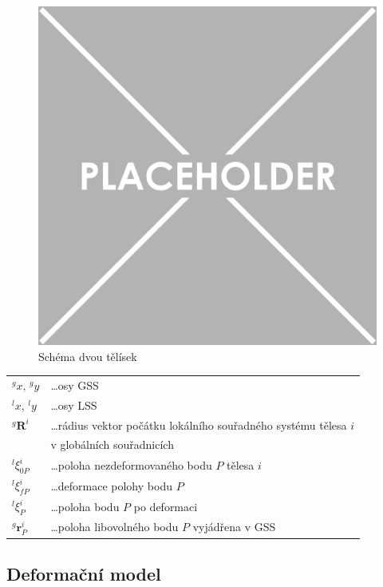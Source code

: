 \begin{figure}[h]
	\centering
	\includegraphics[width=0.85\linewidth]{img/placeholder.pdf}
	\caption{Schéma dvou tělísek}
	\label{fig:MBS_metoda}
\end{figure}

\begin{tabular}{@{}ll}
	$^gx, \, ^gy$ &\dots osy GSS\\
	$^lx, \, ^ly$ &\dots osy LSS\\
	$ ^g\mathbf{R}^i $ &\dots rádius vektor počátku lokálního souřadného systému tělesa $ i $ \\ &v globálních souřadnicích\\
	$ ^l\xi_{0P}^i $ &\dots poloha nezdeformovaného bodu $ P $ tělesa $ i $\\
	$ ^l\xi_{fP}^i $ &\dots deformace polohy bodu $ P $\\
	$ ^l\xi_{P}^i $ &\dots poloha bodu $ P $ po deformaci\\
	$ ^g\mathbf{r}_P^i $ &\dots poloha libovolného bodu $ P $ vyjádřena v GSS\\
\end{tabular}


\subsection{Deformační model}

